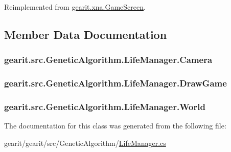 Reimplemented from \hyperlink{classgearit_1_1xna_1_1_game_screen_a6bb803502dfbd62b275c2a21d182f88e}{gearit.\+xna.\+Game\+Screen}.



\subsection{Member Data Documentation}
\hypertarget{classgearit_1_1src_1_1_genetic_algorithm_1_1_life_manager_acc32fa2ae02240aef1c4c8b5bce49e14}{
\subsubsection[{Camera}]{ gearit.\+src.\+Genetic\+Algorithm.\+Life\+Manager.\+Camera}}\label{classgearit_1_1src_1_1_genetic_algorithm_1_1_life_manager_acc32fa2ae02240aef1c4c8b5bce49e14}
\hypertarget{classgearit_1_1src_1_1_genetic_algorithm_1_1_life_manager_a70f539cc4ade057aa9649e49ef5d35ec}{
\subsubsection[{Draw\+Game}]{ gearit.\+src.\+Genetic\+Algorithm.\+Life\+Manager.\+Draw\+Game}}\label{classgearit_1_1src_1_1_genetic_algorithm_1_1_life_manager_a70f539cc4ade057aa9649e49ef5d35ec}
\hypertarget{classgearit_1_1src_1_1_genetic_algorithm_1_1_life_manager_ac0561af5b425b477dac149eaf9d4df2d}{
\subsubsection[{World}]{ gearit.\+src.\+Genetic\+Algorithm.\+Life\+Manager.\+World\hspace{0.3cm}{\ttfamily [static]}}}\label{classgearit_1_1src_1_1_genetic_algorithm_1_1_life_manager_ac0561af5b425b477dac149eaf9d4df2d}


The documentation for this class was generated from the following file\+:\begin{DoxyCompactItemize}
\item 
gearit/gearit/src/\+Genetic\+Algorithm/\hyperlink{_life_manager_8cs}{Life\+Manager.\+cs}\end{DoxyCompactItemize}
